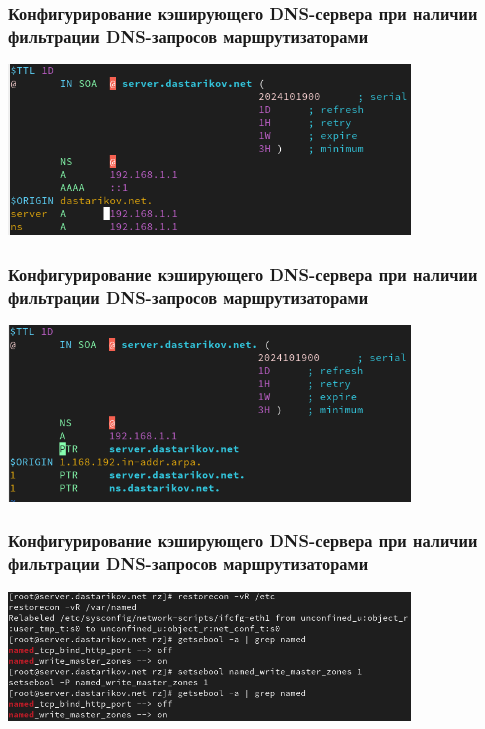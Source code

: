 \begin{frame}
\frametitle{Конфигурирование кэширующего DNS-сервера при наличии фильтрации DNS-запросов маршрутизаторами}
    \centering
    \includegraphics[width=0.8\textwidth]{../images/image10.png}
\end{frame}


\begin{frame}
\frametitle{Конфигурирование кэширующего DNS-сервера при наличии фильтрации DNS-запросов маршрутизаторами}
    \centering
    \includegraphics[width=0.8\textwidth]{../images/image11.png}
\end{frame}


\begin{frame}
\frametitle{Конфигурирование кэширующего DNS-сервера при наличии фильтрации DNS-запросов маршрутизаторами}
    \centering
    \includegraphics[width=0.8\textwidth]{../images/image12.png}
\end{frame}


